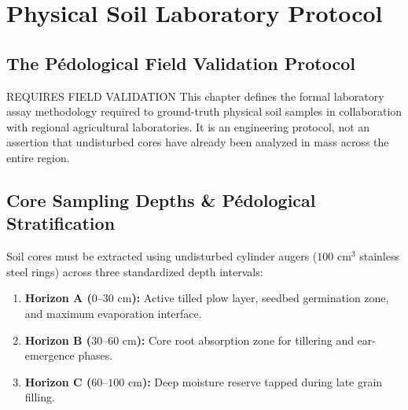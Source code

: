 \documentclass[11pt,a4paper,oneside]{report}
\begin{document}
\chapter{Physical Soil Laboratory Protocol}

\section{The Pédological Field Validation Protocol}
\begin{evidencebox}{REQUIRES FIELD VALIDATION}
This chapter defines the formal laboratory assay methodology required to ground-truth physical soil samples in collaboration with regional agricultural laboratories. It is an engineering protocol, not an assertion that undisturbed cores have already been analyzed in mass across the entire region.
\end{evidencebox}

\section{Core Sampling Depths \& Pédological Stratification}
Soil cores must be extracted using undisturbed cylinder augers ($100\text{ cm}^3$ stainless steel rings) across three standardized depth intervals:
\begin{enumerate}
    \item \textbf{Horizon A ($0–30\text{ cm}$):} Active tilled plow layer, seedbed germination zone, and maximum evaporation interface.
    \item \textbf{Horizon B ($30–60\text{ cm}$):} Core root absorption zone for tillering and ear-emergence phases.
    \item \textbf{Horizon C ($60–100\text{ cm}$):} Deep moisture reserve tapped during late grain filling.
\end{enumerate}
\end{document}
